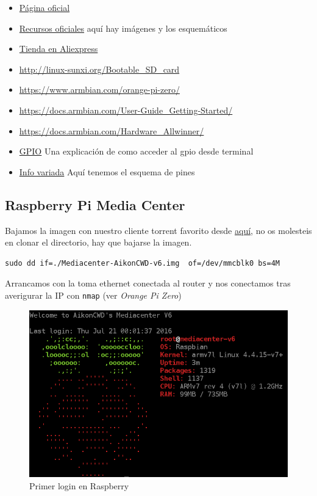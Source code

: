 \documentclass[12pt,spanish,]{article}
\providecommand{\tightlist}{%
  \setlength{\itemsep}{0pt}\setlength{\parskip}{0pt}}
\begin{document}
\begin{itemize}
\tightlist
\item
  \href{http://www.orangepi.org/}{Página oficial}
\item
  \href{http://www.orangepi.org/downloadresources/}{Recursos oficiales}
  aquí hay imágenes y los esquemáticos
\item
  \href{https://www.aliexpress.com/store/1553371?spm=2114.8147860.0.0.F1q43C}{Tienda
  en Aliexpress}
\item
  \url{http://linux-sunxi.org/Bootable_SD_card}
\item
  \url{https://www.armbian.com/orange-pi-zero/}
\item
  \url{https://docs.armbian.com/User-Guide_Getting-Started/}
\item
  \url{https://docs.armbian.com/Hardware_Allwinner/}
\item
  \href{https://linux-sunxi.org/GPIO}{GPIO} Una explicación de como
  acceder al gpio desde terminal
\item
  \href{https://linux-sunxi.org/Orange_Pi_Zero}{Info variada} Aquí
  tenemos el esquema de pines
\end{itemize}

\subsection{Raspberry Pi Media Center}\label{raspberry-pi-media-center}

Bajamos la imagen con nuestro cliente torrent favorito desde
\href{https://github.com/aikoncwd/aikoncwd-rpi-mediacenter}{aquí}, no os
molesteis en clonar el directorio, hay que bajarse la imagen.

\begin{verbatim}
sudo dd if=./Mediacenter-AikonCWD-v6.img  of=/dev/mmcblk0 bs=4M
\end{verbatim}

Arrancamos con la toma ethernet conectada al router y nos conectamos
tras averigurar la IP con \texttt{nmap} (ver \emph{Orange Pi Zero})

\begin{figure}[htbp]
\centering
\includegraphics{src/img/RaspiFirstLogin.png}
\caption{Primer login en Raspberry}
\end{figure}
\end{document}

